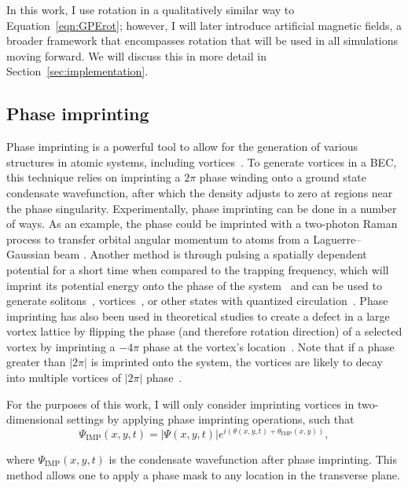 In this work, I use rotation in a qualitatively similar way to Equation~\eqref{eqn:GPErot}; however, I will later introduce artificial magnetic fields, a broader framework that encompasses rotation that will be used in all simulations moving forward.
We will discuss this in more detail in Section~\ref{sec:implementation}.

\subsection{Phase imprinting}

Phase imprinting is a powerful tool to allow for the generation of various structures in atomic systems, including vortices~\cite{kumar2018, moulder2012, burger1999, denschlag2000, wu2002}.
To generate vortices in a BEC, this technique relies on imprinting a $2\pi$ phase winding onto a ground state condensate wavefunction, after which the density adjusts to zero at regions near the phase singularity.
Experimentally, phase imprinting can be done in a number of ways.
As an example, the phase could be imprinted with a two-photon Raman process to transfer orbital angular momentum to atoms from a Laguerre--Gaussian beam \cite{moulder2012, ryu2007}.
Another method is through pulsing a spatially dependent potential for a short time when compared to the trapping frequency, which will imprint its potential energy onto the phase of the system~\cite{kasevich1991} and can be used to generate solitons~\cite{denschlag2000}, vortices~\cite{gajda1999}, or other states with quantized circulation~\cite{kumar2018}.
Phase imprinting has also been used in theoretical studies to create a defect in a large vortex lattice by flipping the phase (and therefore rotation direction) of a selected vortex by imprinting a $-4\pi$ phase at the vortex's location~\cite{o2016topo}.
Note that if a phase greater than $|2\pi|$ is imprinted onto the system, the vortices are likely to decay into multiple vortices of $|2\pi|$ phase~\cite{shin2004}.

For the purposes of this work, I will only consider imprinting vortices in two-dimensional settings by applying phase imprinting operations, such that
\begin{equation}
\Psi_{\text{IMP}}(x,y,t) = |\Psi(x,y,t)|e^{i(\theta(x,y,t) + \theta_{\text{IMP}}(x,y))},
\end{equation}

\noindent where $\Psi_{\text{IMP}}(x,y,t)$ is the condensate wavefunction after phase imprinting.
This method allows one to apply a phase mask to any location in the transverse plane.

